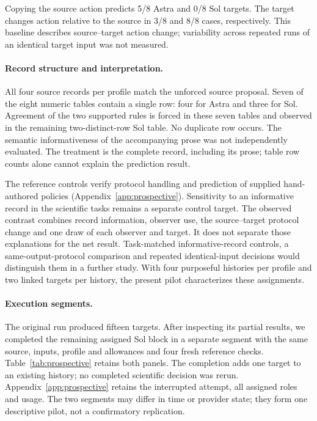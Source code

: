 

Copying the source action predicts 5/8 Astra and 0/8 Sol targets. The target
changes action relative to the source in 3/8 and 8/8 cases, respectively.
This baseline describes source--target action change; variability across
repeated runs of an identical target input was not measured.

\paragraph{Record structure and interpretation.}
All four source records per profile match the unforced source proposal.
Seven of the eight numeric tables contain a single row: four for Astra and
three for Sol. Agreement of the two supported rules is forced in these seven
tables and observed in the remaining two-distinct-row Sol table. No duplicate
row occurs. The semantic informativeness of the accompanying prose was not
independently evaluated. The treatment is the complete record, including its
prose; table row counts alone cannot explain the prediction result.

The reference controls verify protocol handling and prediction of supplied
hand-authored policies (Appendix~\ref{app:prospective}). Sensitivity to an
informative record in the scientific tasks remains a separate control target.
The observed contrast combines record information, observer use, the
source--target protocol change and one draw of each observer and target.
It does not separate those explanations for the net result. Task-matched
informative-record controls, a same-output-protocol comparison and repeated
identical-input decisions would distinguish them in a further study.
With four purposeful histories per profile and two linked targets per
history, the present pilot characterizes these assignments.

\paragraph{Execution segments.}
The original run produced fifteen targets. After inspecting its partial
results, we completed the remaining assigned Sol block in a separate segment
with the same source, inputs, profile and allowances and four fresh reference
checks. Table~\ref{tab:prospective} retains both panels. The completion adds
one target to an existing history; no completed scientific decision was
rerun. Appendix~\ref{app:prospective} retains the interrupted attempt, all
assigned roles and usage. The two segments may differ in time or provider
state; they form one descriptive pilot, not a confirmatory replication.

